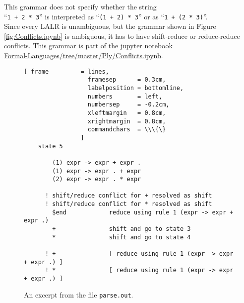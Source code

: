 \noindent
This grammar does not specify whether the string
\\[0.2cm]
\hspace*{1.3cm} 
``\texttt{1 + 2 * 3}'' \quad is interpreted as \quad  ``\texttt{(1 + 2) * 3}'' \quad or as \quad ``\texttt{1 +
  (2 * 3)}''. 
\\[0.2cm]
Since every LALR is unambiguous, but the grammar shown in Figure \ref{fig:Conflicts.ipynb} is ambiguous,  it
has to have shift-reduce or reduce-reduce conflicts.  This grammar is part of the jupyter notebook 
\\[0.2cm]
\hspace*{1.3cm}
\href{https://github.com/karlstroetmann/Formal-Languages/tree/master/Ply/Conflicts.ipynb}{Formal-Languages/tree/master/Ply/Conflicts.ipynb}.


\begin{figure}[!ht]
\centering
\begin{Verbatim}[ frame         = lines, 
                  framesep      = 0.3cm, 
                  labelposition = bottomline,
                  numbers       = left,
                  numbersep     = -0.2cm,
                  xleftmargin   = 0.8cm,
                  xrightmargin  = 0.8cm,
                  commandchars  = \\\{\}
                ]
    state 5
    
        (1) expr -> expr + expr .
        (1) expr -> expr . + expr
        (2) expr -> expr . * expr
    
      ! shift/reduce conflict for + resolved as shift
      ! shift/reduce conflict for * resolved as shift
        $end            reduce using rule 1 (expr -> expr + expr .)
        +               shift and go to state 3
        *               shift and go to state 4
    
      ! +               [ reduce using rule 1 (expr -> expr + expr .) ]
      ! *               [ reduce using rule 1 (expr -> expr + expr .) ]
\end{Verbatim} 
\vspace*{-0.3cm}
\caption{An excerpt from the file \texttt{parse.out}.}
\label{fig:Conflicts.ipynb:state10}
\end{figure} %

